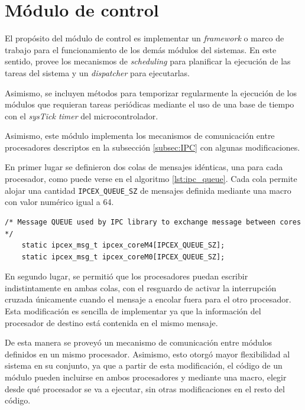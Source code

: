 \clearpage

\section{Módulo de control}
\label{sec:control}

El propósito del módulo de control es implementar un \textit{framework} o marco de trabajo para el funcionamiento de los demás módulos del sistemas.  En este sentido, provee los mecanismos de \textit{scheduling} para planificar la ejecución de las tareas del sistema y un \textit{dispatcher} para ejecutarlas.

Asimismo, se incluyen métodos para temporizar regularmente la ejecución de los módulos que requieran tareas periódicas mediante el uso de una base de tiempo con el \textit{sysTick timer} del microcontrolador.

Asimismo, este módulo implementa los mecanismos de comunicación entre procesadores descriptos en la subsección \ref{subsec:IPC} con algunas modificaciones.

En primer lugar se definieron dos colas de mensajes idénticas, una para cada procesador, como puede verse en el algoritmo \ref{lst:ipc_queue}.  Cada cola permite alojar una cantidad \texttt{IPCEX\_QUEUE\_SZ} de mensajes definida mediante una macro con valor numérico igual a 64.

\vspace{10px}

\begin{lstlisting}[caption={Definición de dos colas de eventos, una para cada procesador.},label={lst:ipc_queue}]
	/* Message QUEUE used by IPC library to exchange message between cores */
	static ipcex_msg_t ipcex_coreM4[IPCEX_QUEUE_SZ];
	static ipcex_msg_t ipcex_coreM0[IPCEX_QUEUE_SZ];
\end{lstlisting}


En segundo lugar, se permitió que los procesadores puedan escribir indistintamente en ambas colas, con el resguardo de activar la interrupción cruzada únicamente cuando el mensaje a encolar fuera para el otro procesador. Esta modificación es sencilla de implementar ya que la información del procesador de destino está contenida en el mismo mensaje.

De esta manera se proveyó un mecanismo de comunicación entre módulos definidos en un mismo procesador.  Asimismo, esto otorgó mayor flexibilidad al sistema en su conjunto, ya que a partir de esta modificación, el código de un módulo pueden incluirse en ambos procesadores y mediante una macro, elegir desde qué procesador se va a ejecutar, sin otras modificaciones en el resto del código.

